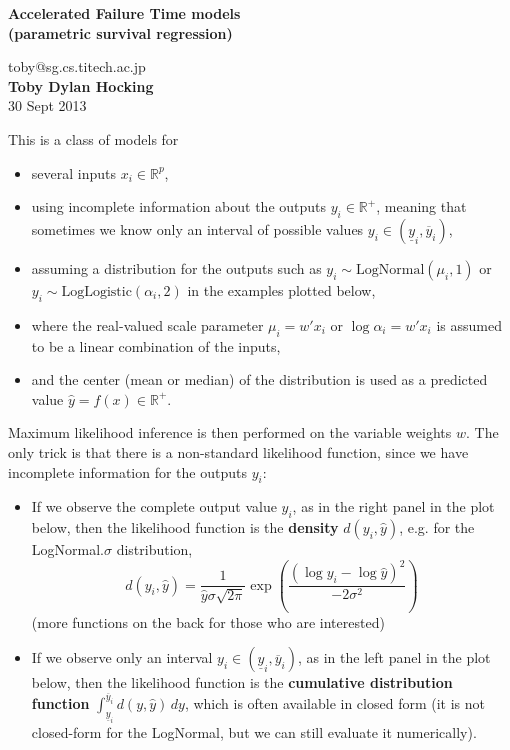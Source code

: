 \documentclass[11pt,twocolumn,a4paper]{article}
\newcommand{\RR}{\mathbb R}
\begin{document}
\begin{center}
  \textbf{Accelerated Failure Time models\\(parametric survival regression)}

toby@sg.cs.titech.ac.jp \\\textbf{Toby Dylan Hocking} \\30 Sept 2013
\end{center}

\thispagestyle{empty}

This is a class of models for

\begin{itemize}
\item several inputs $x_i\in\RR^p$,
\item using incomplete information about the outputs $y_i\in\RR^+$,
  meaning that sometimes we know only an interval of possible values
  $y_i\in(\underline y_i, \overline y_i)$,
\item assuming a distribution for the outputs such as
  $y_i\sim \text{LogNormal}(\mu_i, 1)$ or $y_i\sim
  \text{LogLogistic}(\alpha_i, 2)$ in the examples plotted below,
\item where the real-valued scale parameter $\mu_i= w' x_i$ or
  $\log\alpha_i=w'x_i$ is assumed to be a linear combination of the
  inputs,
\item and the center (mean or median) of the distribution is used as a
  predicted value $\hat y = f(x)\in\RR^+$.
\end{itemize}

Maximum likelihood inference is then performed on the variable weights
$w$. The only trick is that there is a non-standard likelihood
function, since we have incomplete information for the outputs $y_i$:

\begin{itemize}
\item If we observe the complete output value $y_i$, as in the right
  panel in the plot below, then the likelihood function is the
  \textbf{density} $d(y_i, \hat y)$, e.g. for the LogNormal.$\sigma$
  distribution,
  \begin{equation}
    \label{eq:lognormal}
    d(y_i, \hat y) = 
    \frac{1}{\hat y\sigma\sqrt{2\pi}}\exp\left(
      \frac{(\log y_i - \log \hat y)^2}{-2\sigma^2}
    \right)
  \end{equation}
  (more functions on the back for those who are interested)
\item If we observe only an interval $y_i\in(\underline y_i, \overline
  y_i)$, as in the left panel in the plot below, then the likelihood
  function is the \textbf{cumulative distribution function}
  $\int_{\underline y_i}^{\overline y_i} d(y, \hat y)\, dy$, which is
  often available in closed form (it is not closed-form for the
  LogNormal, but we can still evaluate it numerically).
\end{itemize}
\end{document}
